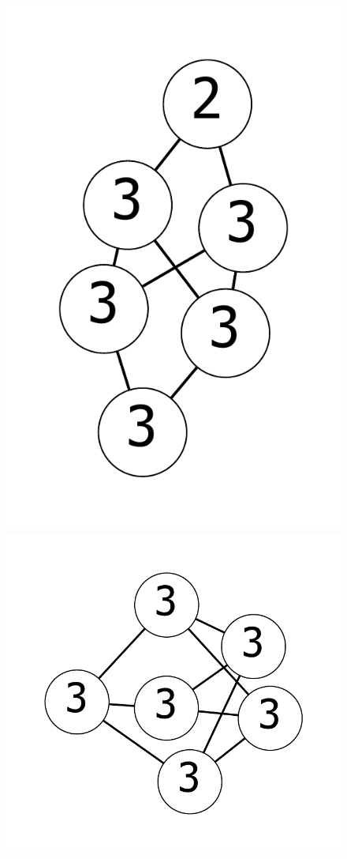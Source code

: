 \documentclass[12pt]{article}
\theoremstyle{plain}
\theoremstyle{definition}
\theoremstyle{remark}
\begin{document}
\begin{figure}[htb]
     	\includegraphics[scale=0.25]{Delta3TriangleFree/001110111011000[3,3,3,2,3,3].pdf}
     	\includegraphics[scale=0.25]{Delta3TriangleFree/001110111111000[3,3,3,3,3,3].pdf}

\end{figure}
\end{document}
